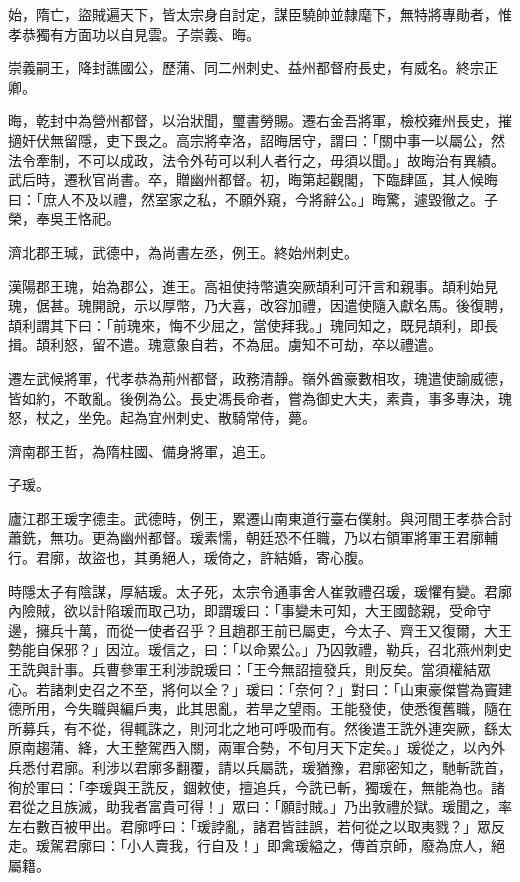 \begin{pinyinscope}
 始，隋亡，盜賊遍天下，皆太宗身自討定，謀臣驍帥並隸麾下，無特將專勛者，惟孝恭獨有方面功以自見雲。子崇義、晦。



 崇義嗣王，降封譙國公，歷蒲、同二州刺史、益州都督府長史，有威名。終宗正卿。



 晦，乾封中為營州都督，以治狀聞，璽書勞賜。遷右金吾將軍，檢校雍州長史，摧擿奸伏無留隱，吏下畏之。高宗將幸洛，詔晦居守，謂曰：「關中事一以屬公，然法令牽制，不可以成政，法令外茍可以利人者行之，毋須以聞。」故晦治有異績。武后時，遷秋官尚書。卒，贈幽州都督。初，晦第起觀閣，下臨肆區，其人候晦曰：「庶人不及以禮，然室家之私，不願外窺，今將辭公。」晦驚，遽毀徹之。子榮，奉吳王恪祀。



 濟北郡王瑊，武德中，為尚書左丞，例王。終始州刺史。



 漢陽郡王瑰，始為郡公，進王。高祖使持幣遺突厥頡利可汗言和親事。頡利始見瑰，倨甚。瑰開說，示以厚幣，乃大喜，改容加禮，因遣使隨入獻名馬。後復聘，頡利謂其下曰：「前瑰來，悔不少屈之，當使拜我。」瑰同知之，既見頡利，即長揖。頡利怒，留不遣。瑰意象自若，不為屈。虜知不可劫，卒以禮遣。



 遷左武候將軍，代孝恭為荊州都督，政務清靜。嶺外酋豪數相攻，瑰遣使諭威德，皆如約，不敢亂。後例為公。長史馮長命者，嘗為御史大夫，素貴，事多專決，瑰怒，杖之，坐免。起為宜州刺史、散騎常侍，薨。



 濟南郡王哲，為隋柱國、備身將軍，追王。



 子瑗。



 廬江郡王瑗字德圭。武德時，例王，累遷山南東道行臺右僕射。與河間王孝恭合討蕭銑，無功。更為幽州都督。瑗素懦，朝廷恐不任職，乃以右領軍將軍王君廓輔行。君廓，故盜也，其勇絕人，瑗倚之，許結婚，寄心腹。



 時隱太子有陰謀，厚結瑗。太子死，太宗令通事舍人崔敦禮召瑗，瑗懼有變。君廓內險賊，欲以計陷瑗而取己功，即謂瑗曰：「事變未可知，大王國懿親，受命守邊，擁兵十萬，而從一使者召乎？且趙郡王前已屬吏，今太子、齊王又復爾，大王勢能自保邪？」因泣。瑗信之，曰：「以命累公。」乃囚敦禮，勒兵，召北燕州刺史王詵與計事。兵曹參軍王利涉說瑗曰：「王今無詔擅發兵，則反矣。當須權結眾心。若諸刺史召之不至，將何以全？」瑗曰：「奈何？」對曰：「山東豪傑嘗為竇建德所用，今失職與編戶夷，此其思亂，若旱之望雨。王能發使，使悉復舊職，隨在所募兵，有不從，得輒誅之，則河北之地可呼吸而有。然後遣王詵外連突厥，繇太原南趨蒲、絳，大王整駕西入關，兩軍合勢，不旬月天下定矣。」瑗從之，以內外兵悉付君廓。利涉以君廓多翻覆，請以兵屬詵，瑗猶豫，君廓密知之，馳斬詵首，徇於軍曰：「李瑗與王詵反，錮敕使，擅追兵，今詵已斬，獨瑗在，無能為也。諸君從之且族滅，助我者富貴可得！」眾曰：「願討賊。」乃出敦禮於獄。瑗聞之，率左右數百被甲出。君廓呼曰：「瑗誖亂，諸君皆詿誤，若何從之以取夷戮？」眾反走。瑗駕君廓曰：「小人賣我，行自及！」即禽瑗縊之，傳首京師，廢為庶人，絕屬籍。




\end{pinyinscope}

